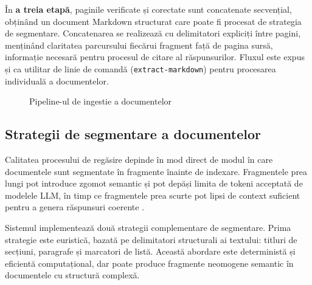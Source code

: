 \documentclass[12pt, a4paper, oneside, romanian]{teza-upb}
\begin{document}
În \textbf{a treia etapă}, paginile verificate și corectate sunt concatenate secvențial, obținând un document Markdown structurat care poate fi procesat de strategia de segmentare. Concatenarea se realizează cu delimitatori expliciți între pagini, menținând claritatea parcursului fiecărui fragment față de pagina sursă, informație necesară pentru procesul de citare al răspunsurilor. Fluxul este expus și ca utilitar de linie de comandă (\texttt{extract-markdown}) pentru procesarea individuală a documentelor.


\begin{figure}[H]
\centering
{}
\caption{Pipeline-ul de ingestie a documentelor}
\label{fig:rag-ingest}
\end{figure}

\subsection{Strategii de segmentare a documentelor}

Calitatea procesului de regăsire depinde în mod direct de modul în care documentele sunt segmentate în fragmente înainte de indexare. Fragmentele prea lungi pot introduce zgomot semantic și pot depăși limita de tokeni acceptată de modelele LLM, în timp ce fragmentele prea scurte pot lipsi de context suficient pentru a genera răspunsuri coerente \cite{lewis2020retrieval}.

Sistemul implementează două strategii complementare de segmentare. Prima strategie este euristică, bazată pe delimitatori structurali ai textului: titluri de secțiuni, paragrafe și marcatori de listă. Această abordare este deterministă și eficientă computațional, dar poate produce fragmente neomogene semantic în documentele cu structură complexă.
\end{document}
